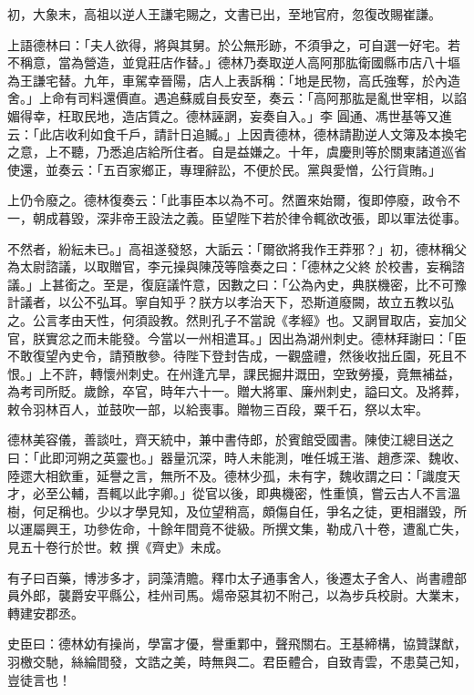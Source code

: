 \begin{pinyinscope}
 初，大象末，高祖以逆人王謙宅賜之，文書已出，至地官府，忽復改賜崔謙。



 上語德林曰：「夫人欲得，將與其舅。於公無形跡，不須爭之，可自選一好宅。若不稱意，當為營造，並覓莊店作替。」德林乃奏取逆人高阿那肱衛國縣市店八十塸為王謙宅替。九年，車駕幸晉陽，店人上表訴稱：「地是民物，高氏強奪，於內造舍。」上命有司料還價直。遇追蘇威自長安至，奏云：「高阿那肱是亂世宰相，以諂媚得幸，枉取民地，造店賃之。德林誣誷，妄奏自入。」李
 圓通、馮世基等又進云：「此店收利如食千戶，請計日追贓。」上因責德林，德林請勘逆人文簿及本換宅之意，上不聽，乃悉追店給所住者。自是益嫌之。十年，虞慶則等於關東諸道巡省使還，並奏云：「五百家鄉正，專理辭訟，不便於民。黨與愛憎，公行貨賄。」



 上仍令廢之。德林復奏云：「此事臣本以為不可。然置來始爾，復即停廢，政令不一，朝成暮毀，深非帝王設法之義。臣望陛下若於律令輒欲改張，即以軍法從事。



 不然者，紛紜未已。」高祖遂發怒，大詬云：「爾欲將我作王莽邪？」初，德林稱父為太尉諮議，以取贈官，李元操與陳茂等陰奏之曰：「德林之父終
 於校書，妄稱諮議。」上甚銜之。至是，復庭議忤意，因數之曰：「公為內史，典朕機密，比不可豫計議者，以公不弘耳。寧自知乎？朕方以孝治天下，恐斯道廢闕，故立五教以弘之。公言孝由天性，何須設教。然則孔子不當說《孝經》也。又誷冒取店，妄加父官，朕實忿之而未能發。今當以一州相遣耳。」因出為湖州刺史。德林拜謝曰：「臣不敢復望內史令，請預散參。待陛下登封告成，一觀盛禮，然後收拙丘園，死且不恨。」上不許，轉懷州刺史。在州逢亢旱，課民掘井溉田，空致勞擾，竟無補益，為考司所貶。歲餘，卒官，時年六十一。贈大將軍、廉州刺史，謚曰文。及將葬，
 敕令羽林百人，並鼓吹一部，以給喪事。贈物三百段，粟千石，祭以太牢。



 德林美容儀，善談吐，齊天統中，兼中書侍郎，於賓館受國書。陳使江總目送之曰：「此即河朔之英靈也。」器量沉深，時人未能測，唯任城王湝、趙彥深、魏收、陸遝大相欽重，延譽之言，無所不及。德林少孤，未有字，魏收謂之曰：「識度天才，必至公輔，吾輒以此字卿。」從官以後，即典機密，性重慎，嘗云古人不言溫樹，何足稱也。少以才學見知，及位望稍高，頗傷自任，爭名之徒，更相譖毀，所以運屬興王，功參佐命，十餘年間竟不徙級。所撰文集，勒成八十卷，遭亂亡失，見五十卷行於世。敕
 撰《齊史》未成。



 有子曰百藥，博涉多才，詞藻清贍。釋巾太子通事舍人，後遷太子舍人、尚書禮部員外郎，襲爵安平縣公，桂州司馬。煬帝惡其初不附己，以為步兵校尉。大業末，轉建安郡丞。



 史臣曰：德林幼有操尚，學富才優，譽重鄴中，聲飛關右。王基締構，協贊謀猷，羽檄交馳，絲綸間發，文誥之美，時無與二。君臣體合，自致青雲，不患莫己知，豈徒言也！



\end{pinyinscope}